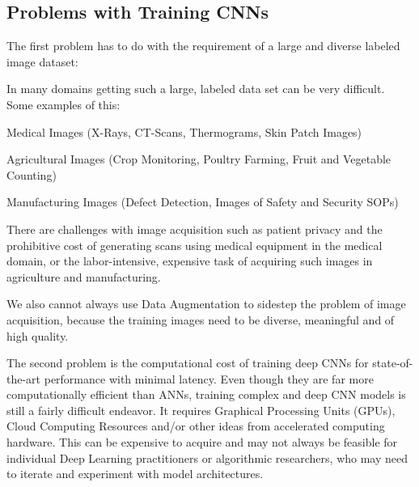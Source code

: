 	\subsection{Problems with Training CNNs}
	\begin{bulletedlist}
		\item The first problem has to do with the requirement of a large and diverse labeled image dataset:
		\begin{bulletedlist}
			\item In many domains getting such a large, labeled data set can be very difficult.  Some examples of this:
			\begin{bulletedlist}
				\item Medical Images (X-Rays, CT-Scans, Thermograms, Skin Patch Images)
				\item Agricultural Images (Crop Monitoring, Poultry Farming, Fruit and Vegetable Counting)
				\item Manufacturing Images (Defect Detection, Images of Safety and Security SOPs)
			\end{bulletedlist}
			\item There are challenges with image acquisition such as patient privacy and the prohibitive cost of generating scans using medical equipment in the medical domain, or the labor-intensive, expensive task of acquiring such images in agriculture and  manufacturing.
			\item We also cannot always use Data Augmentation to sidestep the problem of image acquisition, because the training images need to be diverse, meaningful and of high quality.
		\end{bulletedlist}
		\item The second problem is the computational cost of training deep CNNs for state-of-the-art performance with minimal latency.  Even though they are far more computationally efficient than ANNs, training complex and deep CNN models is still a fairly difficult endeavor. It requires Graphical Processing Units (GPUs), Cloud Computing Resources and/or other ideas from accelerated computing hardware. This can be expensive to acquire and may not always be feasible for individual Deep Learning practitioners or algorithmic researchers, who may need to iterate and experiment with model architectures.
	\end{bulletedlist}

